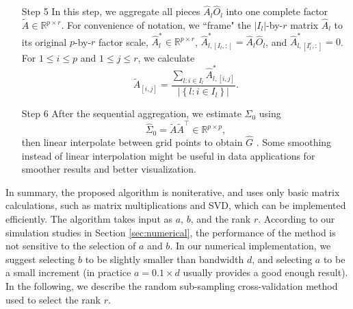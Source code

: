 \documentclass[11pt]{article}
\newcommand{\0}{{\mathbf{0}}}
\newcommand{\1}{{\mathbf{1}}}
\begin{document}
\begin{enumerate}
	\item[Step 5] In this step, we aggregate all pieces $\hat{A}_l\hat{O}_l$ into one complete factor $\tilde{A} \in \mathbb{R}^{p\times r}$. For convenience of notation, we ``frame" the $|I_l|$-by-$r$ matrix $\hat{A}_l$ to its original $p$-by-$r$ factor scale, $\hat{A}^\ast_l \in \mathbb{R}^{p\times r}$, $\hat{A}^\ast_{l, [I_l, :]} = \hat{A}_l\hat{O}_l$, and $\hat{A}^\ast_{l, [I_l^c, :]} = 0$. For $1\leq i\leq p$ and $1\leq j\leq r$, we calculate
	\begin{equation}\label{eq:tilde-A}
	\tilde{A}_{[i, j]} = \frac{\sum_{l: i\in I_l}\hat{A}_{l, [i, j]}^\ast}{\left|\left\{l: i\in I_l\right\}\right|}.
	\end{equation}	
	\item[Step 6] After the sequential aggregation, we estimate $\Sigma_0$ using 
	\begin{equation}
	\hat{\Sigma}_0 = \tilde{A}\tilde{A}^\top \in \mathbb{R}^{p\times p},
	\end{equation}
	then linear interpolate between grid points to obtain $\hat G$ \citep[Chapter~3.6]{Press:1992:NRC:148286}. Some smoothing instead of linear interpolation might be useful in data applications for smoother results and better visualization.
\end{enumerate}

 In summary, the proposed algorithm is noniterative, and uses only basic matrix calculations, such as matrix multiplications and SVD, which can be implemented efficiently. The algorithm takes input as $a$, $b$, and the rank $r$. According to our simulation studies in Section \ref{sec:numerical}, the performance of the method is not sensitive to the selection of $a$ and $b$. In our numerical implementation, we suggest selecting $b$ to be slightly smaller than bandwidth $d$, and selecting $a$ to be a small increment (in practice $a = 0.1\times d$ usually provides a good enough result). In the following, we describe the random sub-sampling cross-validation method \citep{picard1984cross} used to select the rank $r$. 
\end{document}
